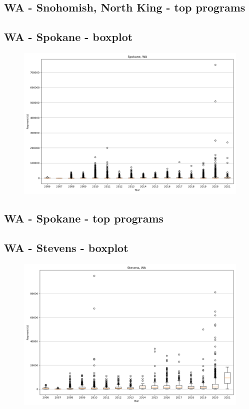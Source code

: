\subsection*{WA - Snohomish, North King - top programs}

\newpage
\subsection*{WA - Spokane - boxplot}
\begin{figure}[h]
\centering
\includegraphics[width=7in]{../output/boxplots/counties/Spokane-WA_boxplot.png}
\end{figure}


\subsection*{WA - Spokane - top programs}

\newpage
\subsection*{WA - Stevens - boxplot}
\begin{figure}[h]
\centering
\includegraphics[width=7in]{../output/boxplots/counties/Stevens-WA_boxplot.png}
\end{figure}


